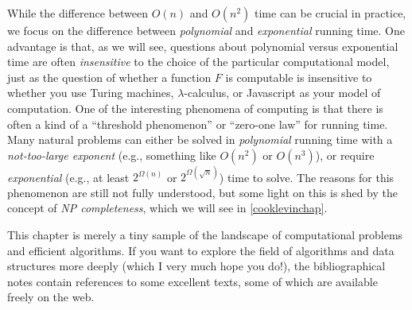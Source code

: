 While the difference between \(O(n)\) and \(O(n^2)\) time can be crucial
in practice, we focus on the difference between \emph{polynomial} and
\emph{exponential} running time. One advantage is that, as we will see,
questions about polynomial versus exponential time are often
\emph{insensitive} to the choice of the particular computational model,
just as the question of whether a function \(F\) is computable is
insensitive to whether you use Turing machines, \(\lambda\)-calculus, or
Javascript as your model of computation. One of the interesting
phenomena of computing is that there is often a kind of a ``threshold
phenomenon'' or ``zero-one law'' for running time. Many natural problems
can either be solved in \emph{polynomial} running time with a
\emph{not-too-large exponent} (e.g., something like \(O(n^2)\) or
\(O(n^3)\)), or require \emph{exponential} (e.g., at least
\(2^{\Omega(n)}\) or \(2^{\Omega(\sqrt{n})}\)) time to solve. The
reasons for this phenomenon are still not fully understood, but some
light on this is shed by the concept of \emph{NP completeness}, which we
will see in \cref{cooklevinchap}.

This chapter is merely a tiny sample of the landscape of computational
problems and efficient algorithms. If you want to explore the field of
algorithms and data structures more deeply (which I very much hope you
do!), the bibliographical notes contain references to some excellent
texts, some of which are available freely on the web.

\hypertarget{relationpartsrem}{}

